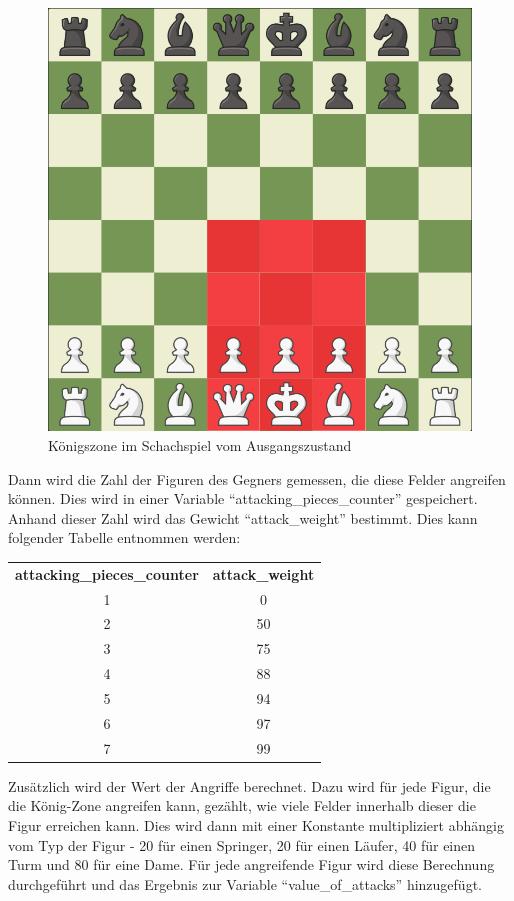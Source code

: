 \begin{figure}[h]
\centering
\includegraphics[width=\textwidth/5*3]{images/king_zone.PNG}

\caption{Königszone im Schachspiel vom Ausgangszustand \cite{}}\label{fig:king_zone}
\end{figure}

Dann wird die Zahl der Figuren des Gegners gemessen, die diese Felder angreifen können. Dies wird in einer Variable ``attacking\_pieces\_counter'' gespeichert. Anhand dieser Zahl wird das Gewicht ``attack\_weight'' bestimmt. Dies kann folgender Tabelle entnommen werden: \cite{O.V.2019b}

\begin{tabular}{c c}
\textbf{attacking\_pieces\_counter} & \textbf{attack\_weight}\\
1 & 0\\
2 & 50\\
3 & 75\\
4 & 88\\
5 & 94\\
6 & 97\\
7 & 99
\end{tabular}

Zusätzlich wird der Wert der Angriffe berechnet. Dazu wird für jede Figur, die die König-Zone angreifen kann, gezählt, wie viele Felder innerhalb dieser die Figur erreichen kann. Dies wird dann mit einer Konstante multipliziert abhängig vom Typ der Figur - 20 für einen Springer, 20 für einen Läufer, 40 für einen Turm und 80 für eine Dame. Für jede angreifende Figur wird diese Berechnung durchgeführt und das Ergebnis zur Variable ``value\_of\_attacks'' hinzugefügt.  \cite{O.V.2019b}

